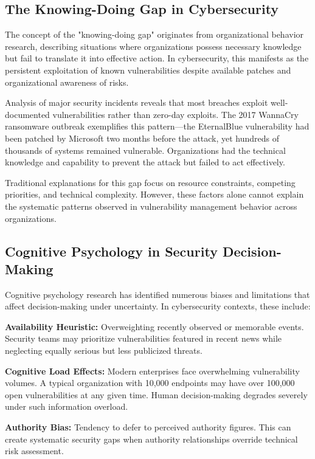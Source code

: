 \documentclass[10pt, twocolumn]{article}
\begin{document}
\subsection{The Knowing-Doing Gap in Cybersecurity}

The concept of the "knowing-doing gap" originates from organizational behavior research\cite{pfeffer2000}, describing situations where organizations possess necessary knowledge but fail to translate it into effective action. In cybersecurity, this manifests as the persistent exploitation of known vulnerabilities despite available patches and organizational awareness of risks.

Analysis of major security incidents reveals that most breaches exploit well-documented vulnerabilities rather than zero-day exploits. The 2017 WannaCry ransomware outbreak exemplifies this pattern—the EternalBlue vulnerability had been patched by Microsoft two months before the attack, yet hundreds of thousands of systems remained vulnerable. Organizations had the technical knowledge and capability to prevent the attack but failed to act effectively.

Traditional explanations for this gap focus on resource constraints, competing priorities, and technical complexity. However, these factors alone cannot explain the systematic patterns observed in vulnerability management behavior across organizations.

\subsection{Cognitive Psychology in Security Decision-Making}

Cognitive psychology research has identified numerous biases and limitations that affect decision-making under uncertainty\cite{tversky1974}. In cybersecurity contexts, these include:

\textbf{Availability Heuristic:} Overweighting recently observed or memorable events. Security teams may prioritize vulnerabilities featured in recent news while neglecting equally serious but less publicized threats.

\textbf{Cognitive Load Effects:} Modern enterprises face overwhelming vulnerability volumes. A typical organization with 10,000 endpoints may have over 100,000 open vulnerabilities at any given time\cite{nvd2023}. Human decision-making degrades severely under such information overload\cite{miller1956}.

\textbf{Authority Bias:} Tendency to defer to perceived authority figures. This can create systematic security gaps when authority relationships override technical risk assessment.
\end{document}
